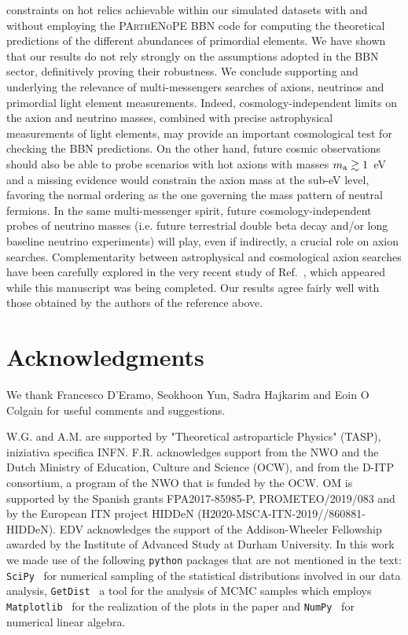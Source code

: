 \documentclass[fleqn,usenatbib,letters]{mnras}
\begin{document}
constraints on hot relics achievable within our simulated datasets with and without employing the \textsc{PArthENoPE} BBN code for computing the theoretical predictions of the different abundances of primordial elements. We have shown that our results do not rely strongly on the assumptions adopted in the BBN sector, definitively proving their robustness. We conclude supporting and underlying the relevance of multi-messengers searches of axions, neutrinos and primordial  light element measurements. Indeed, cosmology-independent limits on the axion and neutrino masses, combined with precise astrophysical measurements of light elements, may provide an important cosmological test for checking the BBN predictions. On the other hand, future cosmic observations should also be able to probe scenarios with hot axions with masses $m_{\rm a}\gtrsim 1$~eV and a missing evidence would constrain the axion mass at the sub-eV level, favoring the normal ordering as the one governing the mass pattern of neutral fermions. In the same multi-messenger spirit, future cosmology-independent probes of neutrino masses (i.e.  future terrestrial double beta decay and/or long baseline neutrino experiments) will play, even if indirectly, a crucial role on axion searches. Complementarity between astrophysical and cosmological axion searches have been carefully explored in the very recent study of Ref.~\citep{Green:2021hjh}, which appeared while this manuscript was being completed. Our results agree fairly well with those obtained by the authors of the reference above.

\section*{Acknowledgments}
We thank Francesco D'Eramo, Seokhoon Yun, Sadra Hajkarim and Eoin O Colgain for useful comments and suggestions.

W.G. and A.M. are supported by "Theoretical astroparticle Physics" (TASP), iniziativa specifica INFN. F.R. acknowledges support from the NWO and the Dutch Ministry of Education, Culture and Science (OCW), and from the D-ITP consortium, a program of the NWO that is funded by the OCW. 
OM is supported by the Spanish grants FPA2017-85985-P, PROMETEO/2019/083 and by the European ITN project HIDDeN (H2020-MSCA-ITN-2019//860881-HIDDeN).
EDV acknowledges the support of the Addison-Wheeler Fellowship awarded by the Institute of Advanced Study at Durham University.
In this work we made use of the following \texttt{python} packages that are not mentioned in the text: \texttt{SciPy}~\citep{2020SciPy-NMeth} for numerical sampling of the statistical distributions involved in our data analysis, \texttt{GetDist}~\citep{Lewis:2019xzd} a tool for the analysis of MCMC samples which employs \texttt{Matplotlib}~\citep{Matplotlib} for the realization of the plots in the paper and \texttt{NumPy}~\citep{NumPy} for numerical linear algebra. %
\end{document}
